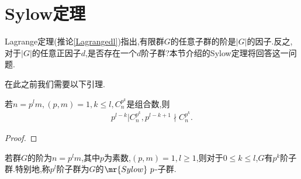 \section{Sylow定理}
Lagrange定理(推论\ref{Lagrangedl})指出,有限群$G$的任意子群的阶是$|G|$的因子.反之,对于$|G|$的任意正因子$d$,是否存在一个$d$阶子群?本节介绍的Sylow定理将回答这一问题.

在此之前我们需要以下引理.
\begin{lemma}\label{p79yl}
    若$n=p^lm,(p,m)=1,k\leq l,C_n^{p^k}$是组合数,则\begin{align*}
        p^{l-k}|C_n^{p^k},p^{l-k+1}\nmid C_n^{p^k}.
    \end{align*}
\end{lemma}
\begin{proof}
    \stars
\end{proof}
\begin{theorem}[Sylow第一定理]
    若群$G$的阶为$n=p^lm$,其中$p$为素数,$(p,m)=1,l\geq1$,则对于$0\leq k\leq l$,$G$有$p^k$阶子群.特别地,称$p^l$阶子群为$G$的$\mr{Sylow}\ p$-子群.
\end{theorem}
